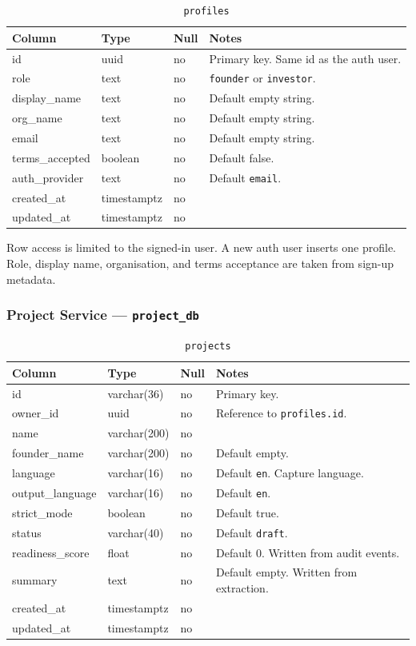 \documentclass[11pt,a4paper]{article}
\begin{document}
\begin{table}[ht]
\centering
\caption{\texttt{profiles}}
\small
\begin{tabular}{@{}llll@{}}
\toprule
\textbf{Column} & \textbf{Type} & \textbf{Null} & \textbf{Notes} \\
\midrule
id & uuid & no & Primary key. Same id as the auth user. \\
role & text & no & \texttt{founder} or \texttt{investor}. \\
display\_name & text & no & Default empty string. \\
org\_name & text & no & Default empty string. \\
email & text & no & Default empty string. \\
terms\_accepted & boolean & no & Default false. \\
auth\_provider & text & no & Default \texttt{email}. \\
created\_at & timestamptz & no & \\
updated\_at & timestamptz & no & \\
\bottomrule
\end{tabular}
\end{table}

Row access is limited to the signed-in user. A new auth user inserts one profile. Role, display name, organisation, and terms acceptance are taken from sign-up metadata.

\subsubsection{Project Service --- \texttt{project\_db}}

\begin{table}[ht]
\centering
\caption{\texttt{projects}}
\small
\begin{tabular}{@{}llll@{}}
\toprule
\textbf{Column} & \textbf{Type} & \textbf{Null} & \textbf{Notes} \\
\midrule
id & varchar(36) & no & Primary key. \\
owner\_id & uuid & no & Reference to \texttt{profiles.id}. \\
name & varchar(200) & no & \\
founder\_name & varchar(200) & no & Default empty. \\
language & varchar(16) & no & Default \texttt{en}. Capture language. \\
output\_language & varchar(16) & no & Default \texttt{en}. \\
strict\_mode & boolean & no & Default true. \\
status & varchar(40) & no & Default \texttt{draft}. \\
readiness\_score & float & no & Default 0. Written from audit events. \\
summary & text & no & Default empty. Written from extraction. \\
created\_at & timestamptz & no & \\
updated\_at & timestamptz & no & \\
\bottomrule
\end{tabular}
\end{table}
\end{document}
